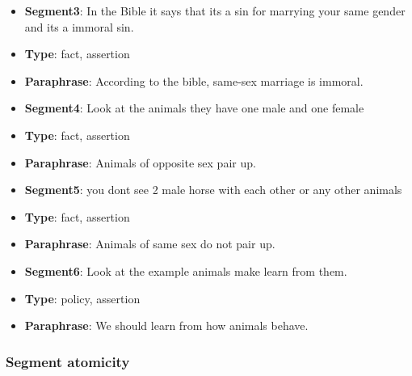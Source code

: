 \begin{itemize}[topsep=0.3cm]
\item[] \textbf{Segment3}: In the Bible it says that its a sin for marrying your same gender and its a immoral sin.
\item[] \textbf{Type}: fact, assertion
\item[] \textbf{Paraphrase}: According to the bible, same-sex marriage is immoral.
\end{itemize}

\begin{itemize}[topsep=0.3cm]
\item[] \textbf{Segment4}: Look at the animals they have one male and one female
\item[] \textbf{Type}: fact, assertion
\item[] \textbf{Paraphrase}: Animals of opposite sex pair up.
\end{itemize}

\begin{itemize}[topsep=0.3cm]
\item[] \textbf{Segment5}: you dont see 2 male horse with each other or any other animals
\item[] \textbf{Type}: fact, assertion
\item[] \textbf{Paraphrase}: Animals of same sex do not pair up.
\end{itemize}

\begin{itemize}[topsep=0.3cm]
\item[] \textbf{Segment6}: Look at the example animals make learn from them.
\item[] \textbf{Type}: policy, assertion
\item[] \textbf{Paraphrase}: We should learn from how animals behave.
\end{itemize}

\subsubsection{Segment atomicity}

